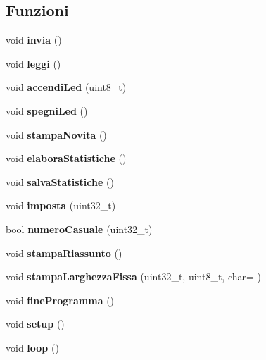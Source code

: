 \subsection*{Funzioni}
\begin{DoxyCompactItemize}
\item 
\mbox{\label{_test__collisioni__master_8cpp_a30929ad9aa20be449cfdcfdf096b011f}} 
void {\bfseries invia} ()
\item 
\mbox{\label{_test__collisioni__master_8cpp_a5ba7c94d7b647769c1eab4535fdf0ca4}} 
void {\bfseries leggi} ()
\item 
\mbox{\label{_test__collisioni__master_8cpp_a3569164e5c9c054a56d5f70566d8a57d}} 
void {\bfseries accendi\+Led} (uint8\+\_\+t)
\item 
\mbox{\label{_test__collisioni__master_8cpp_a06e193cb7e01cd99fcfee23c739abac9}} 
void {\bfseries spegni\+Led} ()
\item 
\mbox{\label{_test__collisioni__master_8cpp_a4060ad64ab502790e4f8676af0643697}} 
void {\bfseries stampa\+Novita} ()
\item 
\mbox{\label{_test__collisioni__master_8cpp_a9c04820d041a5acce0d46251c425b31e}} 
void {\bfseries elabora\+Statistiche} ()
\item 
\mbox{\label{_test__collisioni__master_8cpp_a21422ed259545ab44fccd1a3ea259c63}} 
void {\bfseries salva\+Statistiche} ()
\item 
\mbox{\label{_test__collisioni__master_8cpp_a16424c6485c2e5deefa4adb21859e980}} 
void {\bfseries imposta} (uint32\+\_\+t)
\item 
\mbox{\label{_test__collisioni__master_8cpp_a7cde6740d78618b170b990bac9d1ca2a}} 
bool {\bfseries numero\+Casuale} (uint32\+\_\+t)
\item 
\mbox{\label{_test__collisioni__master_8cpp_ae642b0758db50b62835cbdb190dc3625}} 
void {\bfseries stampa\+Riassunto} ()
\item 
\mbox{\label{_test__collisioni__master_8cpp_a08249380db0a20a56f8a715dedd2dc76}} 
void {\bfseries stampa\+Larghezza\+Fissa} (uint32\+\_\+t, uint8\+\_\+t, char=\textquotesingle{} \textquotesingle{})
\item 
\mbox{\label{_test__collisioni__master_8cpp_ae1b6bae9fef1e0d04a56b321386b699c}} 
void {\bfseries fine\+Programma} ()
\item 
\mbox{\label{_test__collisioni__master_8cpp_a4fc01d736fe50cf5b977f755b675f11d}} 
void {\bfseries setup} ()
\item 
\mbox{\label{_test__collisioni__master_8cpp_afe461d27b9c48d5921c00d521181f12f}} 
void {\bfseries loop} ()
\end{DoxyCompactItemize}
